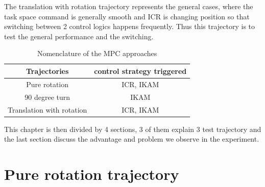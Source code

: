 The translation with rotation trajectory represents the general cases, where the task space command is generally smooth and ICR is changing position so that switching between 2 control logics happens frequently. Thus this trajectory is to test the general performance and the switching.
\begin{table}[!ht]
	\centering
		\begin{tabular}{cc}
		Trajectories   &  control strategy triggered                  \\\midrule
		Pure rotation          &  ICR, IKAM     \\
		90 degree turn          &  IKAM              \\
		Translation with rotation      &  ICR, IKAM              \\\bottomrule
		\end{tabular}
		\vspace{1mm}
	\caption{Nomenclature of the MPC approaches}
	\label{tab:testTrajectory}
\end{table}
This chapter is then divided by 4 sections, 3 of them explain 3 test trajectory and the last section discuss the advantage and problem we observe in the experiment.
\section{Pure rotation trajectory}
\label{sec:pureRotationTraj}
